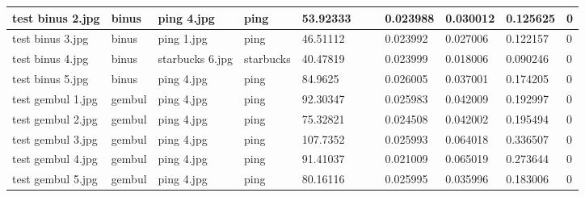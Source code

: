 \begin{landscape}
\begin{longtable}{|p{2cm}|p{1.5cm}|p{2cm}|p{1.5cm}|p{2cm}|p{1cm}|p{2cm}|p{2cm}|p{2cm}|p{2cm}|p{1cm}|}
		test binus 2.jpg     & binus            & ping 4.jpg            & ping                        & 53.92333              &                         &                            & 0.023988              & 0.030012              & 0.125625                 & 0                \\ \hline
		test binus 3.jpg     & binus            & ping 1.jpg            & ping                        & 46.51112              &                         &                            & 0.023992              & 0.027006              & 0.122157                 & 0                \\ \hline
		test binus 4.jpg     & binus            & starbucks 6.jpg       & starbucks                   & 40.47819              &                         &                            & 0.023999              & 0.018006              & 0.090246                 & 0                \\ \hline
		test binus 5.jpg     & binus            & ping 4.jpg            & ping                        & 84.9625               &                         &                            & 0.026005              & 0.037001              & 0.174205                 & 0                \\ \hline
		test gembul 1.jpg    & gembul           & ping 4.jpg            & ping                        & 92.30347              &                         &                            & 0.025983              & 0.042009              & 0.192997                 & 0                \\ \hline
		test gembul 2.jpg    & gembul           & ping 4.jpg            & ping                        & 75.32821              &                         &                            & 0.024508              & 0.042002              & 0.195494                 & 0                \\ \hline
		test gembul 3.jpg    & gembul           & ping 4.jpg            & ping                        & 107.7352              &                         &                            & 0.025993              & 0.064018              & 0.336507                 & 0                \\ \hline
		test gembul 4.jpg    & gembul           & ping 4.jpg            & ping                        & 91.41037              &                         &                            & 0.021009              & 0.065019              & 0.273644                 & 0                \\ \hline
		test gembul 5.jpg    & gembul           & ping 4.jpg            & ping                        & 80.16116              &                         &                            & 0.025995              & 0.035996              & 0.183006                 & 0                \\ \hline

\end{longtable}
\end{landscape}
